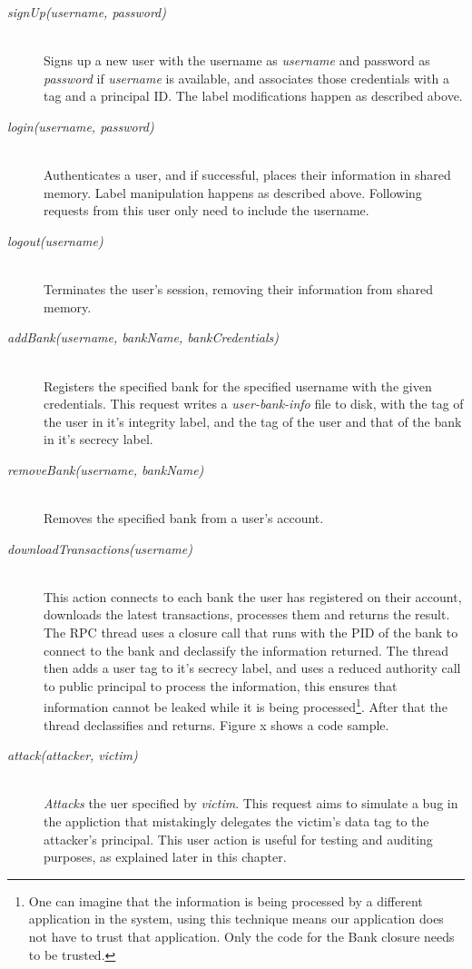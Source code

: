 \begin{description}
  \item[\emph{signUp(username, password)}] \ \\
    Signs up a new user with the username as \emph{username} and 
    password as \emph{password} if \emph{username} is available, and associates
    those credentials with a tag and a principal ID.
    The label modifications happen as described above.
  \item[\emph{login(username, password)}] \ \\
    Authenticates a user, and if successful, places their information in shared 
    memory. Label manipulation happens as described above. Following requests from
    this user only need to include the username.
  \item[\emph{logout(username)}] \ \\
    Terminates the user's session, removing their information from shared memory.
  \item[\emph{addBank(username, bankName, bankCredentials)}] \ \\
    Registers the specified bank for the specified username with the given 
    credentials.
    This request writes a \emph{user-bank-info} file to disk, with the tag of
    the user in it's integrity label, and the tag of the user and that of the bank
    in it's secrecy label.
  \item[\emph{removeBank(username, bankName)}] \ \\
    Removes the specified bank from a user's account.
  \item[\emph{downloadTransactions(username)}] \ \\
    This action connects to each bank the user has registered on their account, 
    downloads the latest transactions, processes them and returns the result.
    The RPC thread uses a closure call that runs with the PID of the bank to
    connect to the bank and declassify the information returned. The thread then
    adds a user tag to it's secrecy label, and uses a reduced authority call to 
    public principal to process the information, this ensures that information
    cannot be leaked while it is being processed\footnote{One can imagine that the 
    information is being processed by a different application in the system, 
    using this technique means our application does not have to trust that 
    application. Only the code for the Bank closure needs to be trusted.}. After
    that the thread declassifies and returns. Figure x shows a code sample.
  \item[\emph{attack(attacker, victim)}] \ \\
    \emph{Attacks} the uer specified by \emph{victim}. This request aims to 
    simulate a bug in the appliction that mistakingly delegates the victim's 
    data tag to the attacker's principal.
    This user action is useful for testing and auditing purposes, as explained later
    in this chapter.
\end{description}


